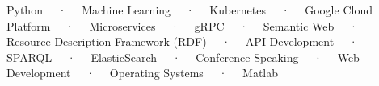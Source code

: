 \begin{cventries}
    
    \cventry
        {}
        {}
        {}
        {}
        {\vspace{-1em}
            \begin{cvitems}
                \item{Python ~~·~~ Machine Learning ~~·~~ Kubernetes ~~·~~ Google Cloud Platform ~~·~~ Microservices ~~·~~ gRPC ~~·~~ Semantic Web ~~·~~ Resource Description Framework (RDF) ~~·~~ API Development ~~·~~ SPARQL ~~·~~ ElasticSearch ~~·~~ Conference Speaking ~~·~~ Web Development ~~·~~ Operating Systems ~~·~~ Matlab}
            \end{cvitems}
        }
        \vspace{-0.2cm}

\end{cventries}
